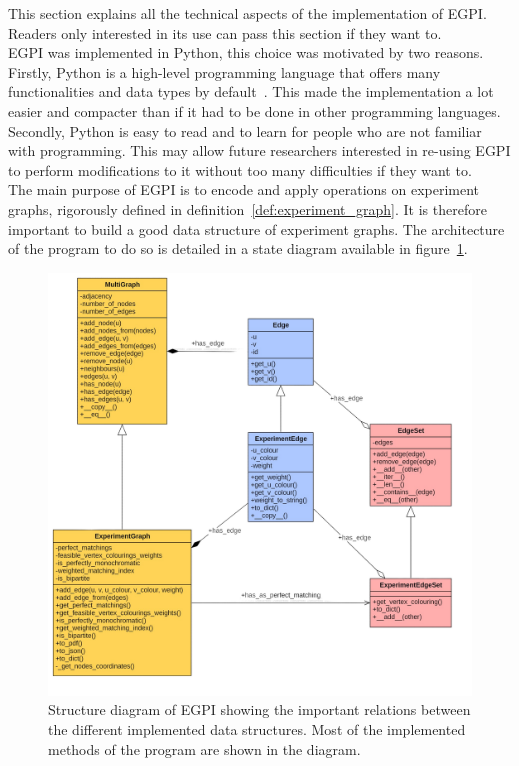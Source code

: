 This section explains all the technical aspects of the implementation of EGPI\@.
Readers only interested in its use can pass this section if they want to.\\

EGPI was implemented in Python, this choice was motivated by two reasons.
Firstly, Python is a high-level programming language that offers many functionalities and data types by default~\cite{python}.
This made the implementation a lot easier and compacter than if it had to be done in other programming languages.
Secondly, Python is easy to read and to learn for people who are not familiar with programming.
This may allow future researchers interested in re-using EGPI to perform modifications to it without too many difficulties if they want to.\\

The main purpose of EGPI is to encode and apply operations on experiment graphs, rigorously defined in definition~\ref{def:experiment_graph}.
It is therefore important to build a good data structure of experiment graphs.
The architecture of the program to do so is detailed in a state diagram available in figure~\ref{fig:structure_diagram}.

\begin{figure}[H]
    \centering
    \includegraphics[scale=0.25]{figures/new_results/egpi/structure_diagram}
    \caption{Structure diagram of EGPI showing the important relations between the different implemented data structures. Most of the implemented methods of the program are shown in the diagram.}
    \label{fig:structure_diagram}
\end{figure}

